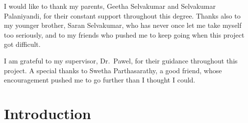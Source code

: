 \begin{abstract}
  Taken together, the watch-repair result supports the dissertation's central claim, that explicitly identifying and weighting the causally relevant steps of a trajectory is a more sample-efficient credit-assignment strategy than either an undifferentiated trajectory-level baseline or a learned return-redistribution network, and the AppWorld result is consistent with the same claim on an exact, single-seed comparison, though it has not been tested for statistical significance across multiple seeds in the way the tabular result has.

\end{abstract}%
\clearpage



\begin{uomoriginality}
  \uomoriginalitydeclaration
\end{uomoriginality}
\uomcopyrightstatement


\begin{uomacknowledgements}
  I would like to thank my parents, Geetha Selvakumar and Selvakumar Palaniyandi, for their constant support throughout this degree. Thanks also to my younger brother, Saran Selvakumar, who has never once let me take myself too seriously, and to my friends who pushed me to keep going when this project got difficult.

  I am grateful to my supervisor, Dr.~Pawel, for their guidance throughout this project. A special thanks to Swetha Parthasarathy, a good friend, whose encouragement pushed me to go further than I thought I could.
\end{uomacknowledgements}


\uomstartmainbody %


\section{Introduction}
\label{sec:introduction}

